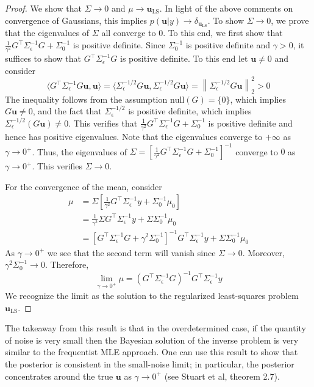 \documentclass[12pt]{article}
\newcommand{\bpar}{\mathbf{u}} %
\newcommand*{\norm}[1]{\left\lVert#1\right\rVert}
\begin{document}
\begin{proof} 
We show that $\Sigma \to 0$ and $\mu \to \bpar_{\text{LS}}$. In light of the above comments on convergence of Gaussians, this implies $p(\bpar|y) \to \delta_{\bpar_{\text{LS}}}$. 
To show $\Sigma \to 0$, we prove that the eigenvalues of $\Sigma$ all converge to $0$. To this end, we first show that $\frac{1}{\gamma^2} G^{\top} \Sigma_{\epsilon}^{-1} G + \Sigma_0^{-1}$
is positive definite. Since $\Sigma_0^{-1}$ is positive definite and $\gamma > 0$, it suffices to show that $G^{\top} \Sigma_{\epsilon}^{-1} G$ is positive definite. To this end let $\bpar \neq 0$
and consider 
\[\langle G^{\top} \Sigma_{\epsilon}^{-1}G \bpar, \bpar \rangle = \langle \Sigma_{\epsilon}^{-1/2}G \bpar, \Sigma_{\epsilon}^{-1/2}G \bpar \rangle = \norm{\Sigma_{\epsilon}^{-1/2}G \bpar}_2^2 > 0 \]
The inequality follows from the assumption $\text{null}(G) = \{0\}$, which implies $G\bpar \neq 0$, and the fact that $\Sigma_{\epsilon}^{-1/2}$ is positive definite, which implies 
$\Sigma_{\epsilon}^{-1/2}\left(G\bpar \right) \neq 0$. This verifies that $\frac{1}{\gamma^2} G^{\top} \Sigma_{\epsilon}^{-1} G + \Sigma_0^{-1}$ is positive definite and hence has positive 
eigenvalues. Note that the eigenvalues converge to $+\infty$ as $\gamma \to 0^+$. Thus, the eigenvalues of $\Sigma = \left[\frac{1}{\gamma^2} G^{\top} \Sigma_{\epsilon}^{-1} G + \Sigma_0^{-1}\right]^{-1}$
converge to $0$ as $\gamma \to 0^+$. This verifies $\Sigma \to 0$. 

For the convergence of the mean, consider 
\begin{align*}
\mu &= \Sigma \left[\frac{1}{\gamma^2} G^{\top} \Sigma_{\epsilon}^{-1} y + \Sigma_0^{-1} \mu_0 \right] \\
       &= \frac{1}{\gamma^2} \Sigma G^{\top} \Sigma_{\epsilon}^{-1}y + \Sigma \Sigma_0^{-1} \mu_0 \\
       &= \left[G^{\top} \Sigma_{\epsilon}^{-1} G + \gamma^2 \Sigma_0^{-1}\right]^{-1} G^{\top} \Sigma_{\epsilon}^{-1} y + \Sigma \Sigma_0^{-1} \mu_0 
\end{align*}
As $\gamma \to 0^+$ we see that the second term will vanish since $\Sigma \to 0$. Moreover, $\gamma^2 \Sigma_0^{-1} \to 0$. Therefore, 
\[\lim_{\gamma \to 0^+} \mu = \left(G^{\top} \Sigma_{\epsilon}^{-1} G \right)^{-1} G^{\top} \Sigma_{\epsilon}^{-1} y\]
We recognize the limit as the solution to the regularized least-squares problem $\bpar_{\text{LS}}$. 
\end{proof}
The takeaway from this result is that in the overdetermined case, if the quantity of noise is very small then the Bayesian solution of the inverse problem is very similar to the 
frequentist MLE approach. One can use this result to show that the posterior is consistent in the small-noise limit; in particular, the posterior concentrates around the true
$\bpar$ as $\gamma \to 0^+$ (see Stuart et al, theorem 2.7). 
\end{document}

